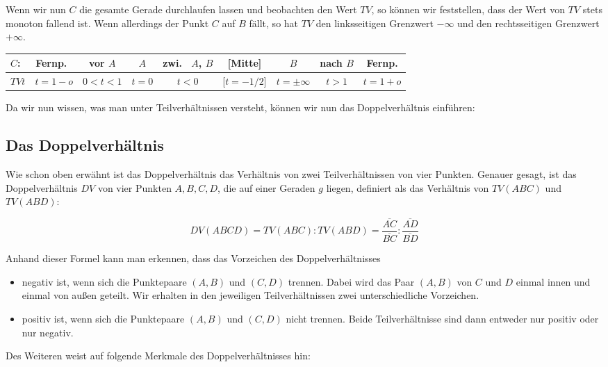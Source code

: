 \documentclass[12pt,a4paper]{article}
\begin{document}
Wenn wir nun $C$ die gesamte Gerade durchlaufen lassen und beobachten den Wert $TV$, so können wir feststellen, dass der Wert von $TV$ stets monoton fallend ist. Wenn allerdings der Punkt $C$ auf $B$ fällt, so hat $TV$ den linksseitigen Grenzwert $-\infty$ und den rechtsseitigen Grenzwert $+\infty$.
\begin{center}
\begin{scriptsize}
\begin{tabular}[htbp]{l|c|c|c|c|c|c|c|c}
$C$: & Fernp.~ & vor $A$ &  $A$ & zwi.~ $A$, $B$ & [Mitte] & $B$ & nach $B$ & Fernp.\\
\hline
$TV t$ & $t = 1 - o$ & $0 < t < 1$ & $t = 0$ & $t < 0$ & [$t = -1/2$] & $t = \pm\infty$ & $t > 1$ & $t = 1 + o$\\
\end{tabular}
\end{scriptsize}
\end{center}

Da wir nun wissen, was man unter Teilverhältnissen versteht, können wir nun das Doppelverhältnis einführen:

\subsection{Das Doppelverhältnis}

Wie schon oben erwähnt ist das Doppelverhältnis das Verhältnis von zwei Teilverhältnissen von vier Punkten. Genauer gesagt, ist das Doppelverhältnis $DV$ von vier Punkten $A, B, C, D$, die auf einer Geraden $g$ liegen, definiert als das Verhältnis von $TV(A B C)$ und $TV(A B D)$:

\[DV(A B C D) = TV(A B C) : TV(A B D) = \dfrac{\overline{A C}}{\overline{B C}} : \dfrac{\overline{A D}}{\overline{B D}}\]

Anhand dieser Formel kann man erkennen, dass das Vorzeichen des Doppelverhältnisses
\begin{itemize}
\item negativ ist, wenn sich die Punktepaare $(A, B)$ und $(C, D)$ trennen. Dabei wird das Paar $(A, B)$ von $C$ und $D$ einmal innen und einmal von außen geteilt. Wir erhalten in den jeweiligen Teilverhältnissen zwei unterschiedliche Vorzeichen.
\item positiv ist, wenn sich die Punktepaare $(A, B)$ und $(C, D)$ nicht trennen. Beide Teilverhältnisse sind dann entweder nur positiv oder nur negativ.
\end{itemize}

Des Weiteren weist \citep{projektiveGeometrie} auf folgende Merkmale des Doppelverhältnisses hin:
\end{document}
